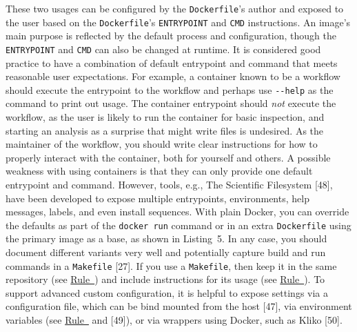 \documentclass[10pt,letterpaper]{article}
\newenvironment{Shaded}{\begin{snugshade}}{\end{snugshade}}
\newcommand{\CommentTok}[1]{\textcolor[rgb]{0.56,0.35,0.01}{\textit{#1}}}
\newcommand{\KeywordTok}[1]{\textcolor[rgb]{0.13,0.29,0.53}{\textbf{#1}}}
\newcommand{\NormalTok}[1]{#1}
\begin{document}
These two usages can be configured by the \texttt{Dockerfile}'s author
and exposed to the user based on the \texttt{Dockerfile}'s
\texttt{ENTRYPOINT} and \texttt{CMD} instructions. An image's main
purpose is reflected by the default process and configuration, though
the \texttt{ENTRYPOINT} and \texttt{CMD} can also be changed at runtime.
It is considered good practice to have a combination of default
entrypoint and command that meets reasonable user expectations. For
example, a container known to be a workflow should execute the
entrypoint to the workflow and perhaps use \texttt{-\/-help} as the
command to print out usage. The container entrypoint should \emph{not}
execute the workflow, as the user is likely to run the container for
basic inspection, and starting an analysis as a surprise that might
write files is undesired. As the maintainer of the workflow, you should
write clear instructions for how to properly interact with the
container, both for yourself and others. A possible weakness with using
containers is that they can only provide one default entrypoint and
command. However, tools, e.g., The Scientific Filesystem {[}48{]}, have
been developed to expose multiple entrypoints, environments, help
messages, labels, and even install sequences. With plain Docker, you can
override the defaults as part of the \texttt{docker\ run} command or in
an extra \texttt{Dockerfile} using the primary image as a base, as shown
in Listing~5. In any case, you should document different variants very
well and potentially capture build and run commands in a
\texttt{Makefile} {[}27{]}. If you use a \texttt{Makefile}, then keep it
in the same repository (see
\hyperref[{rule:mount}]{Rule~}) and include
instructions for its usage (see
\hyperref[{rule:document}]{Rule~}). To support
advanced custom configuration, it is helpful to expose settings via a
configuration file, which can be bind mounted from the host {[}47{]},
via environment variables (see
\hyperref[{rule:pinning}]{Rule~} and {[}49{]}),
or via wrappers using Docker, such as Kliko {[}50{]}.

\scriptsize

\begin{Shaded}
\end{Shaded}
\end{document}
